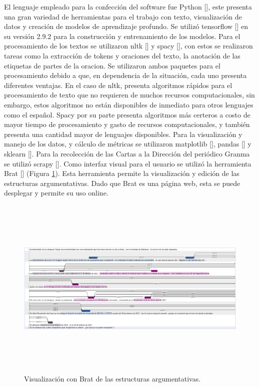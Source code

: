 El lenguaje empleado para la confección del software fue Python [\cite{python}], este presenta 
una gran variedad de herramientas 
para el trabajo con texto, visualización de datos y creación de modelos de aprendizaje profundo.
Se utilizó tensorflow [\cite{tensorflow}] en su versión 2.9.2 para la construcción y entrenamiento de los modelos. 
Para el procesamiento de los textos se utilizaron nltk [\cite{nltk}] y spacy [\cite{spacy}], con estos se realizaron tareas
como la extracción de tokens y oraciones del texto, la anotación de las etiquetas de partes de la oracion. Se utilizaron 
ambos paquetes para el procesamiento debido a que, en dependencia de la situación, cada uno presenta diferentes
ventajas. En el caso de nltk, presenta algoritmos rápidos para el procesamiento de texto que no 
requieren de muchos recursos computacionales, sin embargo, estos algoritmos no están disponibles de inmediato
para otros lenguajes como el español. Spacy por su parte presenta algoritmos más certeros a costo 
de mayor tiempo de procesamiento y gasto de recursos computacionales, y también presenta una cantidad mayor de lenguajes 
disponibles. Para la visualización y manejo de los datos, y cálculo de métricas se utilizaron 
matplotlib [\cite{matplotlib}], pandas [\cite{pandas}] y sklearn [\cite{sklearn}]. 
Para la recolección de las Cartas a la Dirección del periódico Granma se utilizó scrapy [\cite{scrapy}].
Como interfaz visual para el usuario se utilizó la herramienta Brat [\cite{brat}] 
(Figura \ref{fig:brat_persuasive_granma_letters}). Esta herramienta permite
la visualización y edición de las estructuras argumentativas. Dado que Brat es una página web, esta se puede
desplegar y permite su uso online.

\begin{figure}[h!]
	\begin{center}
		\includegraphics[scale=.4, width=435pt, height=250pt]{Graphics/persuasive_2019-03-22|inconformidad-con-la-chequera.png}
		\caption{Visualización con Brat de las estructuras argumentativas.}\label{fig:brat_persuasive_granma_letters}
	\end{center}
\end{figure}

